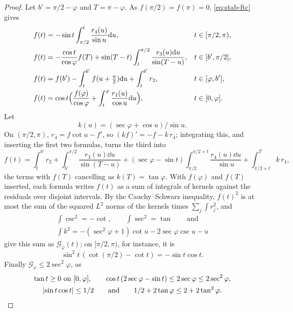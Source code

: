 \begin{proof}
Let $b'=\pi/2-\varphi$ and $T=\pi-\varphi$. As $f(\pi/2)=f(\pi)=0$,
\eqref{eq:stab-ftc} gives
\begin{align*}
  f(t)&=-\sin t\int_{\pi/2}^t\frac{r_4(u)}{\sin u}\mathrm{d} u,
    & t&\in[\pi/2,\pi),\\
  f(t)&=-\frac{\cos t}{\cos\varphi}f(T)
    +\sin(T-t)\int_t^{\pi/2}\frac{r_3(u)\mathrm{d} u}{\sin(T-u)},
    & t&\in[b',\pi/2],\\
  f(t)&=f(b')-\int_t^{b'}f(u+\tfrac\pi2)\mathrm{d} u+\int_t^{b'}r_2,
    & t&\in[\varphi,b'],\\
  f(t)&=\cos t\Bigl(\frac{f(\varphi)}{\cos\varphi}
    +\int_t^\varphi\frac{r_1(u)}{\cos u}\mathrm{d} u\Bigr), & t&\in[0,\varphi].
\end{align*}
Let
\[
  k(u)=(\sec\varphi+\cos u)/\sin u.
\]
On $(\pi/2,\pi)$, $r_4=f\cot u-f'$, so $(kf)'=-f-k\,r_4$; integrating this,
and inserting the first two formulas, turns the third into
\[
  f(t)=\int_t^{b'}r_2+\int_{b'}^{\pi/2}\frac{r_3(u)\dd u}{\sin(T-u)}
  +(\sec\varphi-\sin t)\int_{\pi/2}^{\pi/2+t}\frac{r_4(u)\dd u}{\sin u}
  +\int_{\pi/2+t}^{T}k\,r_4 ,
\]
the terms with $f(T)$ cancelling as $k(T)=\tan\varphi$. With $f(\varphi)$ and
$f(T)$ inserted, each formula writes $f(t)$ as a sum of integrals of kernels
against the residuals over disjoint intervals. By the Cauchy--Schwarz
inequality, $f(t)^2$ is at most the sum of the squared $L^2$ norms of the
kernels times $\sum_j\int r_j^2$, and
\begin{gather*}
  \int\csc^2=-\cot,\qquad\int\sec^2=\tan\qquad\text{and}\\
  \int k^2=-(\sec^2\varphi+1)\cot u-2\sec\varphi\csc u-u
\end{gather*}
give this sum as $\mathcal G_\varphi(t)$; on $[\pi/2,\pi)$, for instance, it is
\[
  \sin^2t\,(\cot(\pi/2)-\cot t)=-\sin t\cos t.
\]
Finally $\mathcal G_\varphi\le2\sec^2\varphi$, as
\begin{gather*}
  \tan t\ge0\text{ on }[0,\varphi],\qquad
  \cos t\,(2\sec\varphi-\sin t)\le2\sec\varphi\le2\sec^2\varphi,\\
  \lvert \sin t\cos t\rvert\le1/2\qquad\text{and}\qquad
  1/2+2\tan\varphi\le2+2\tan^2\varphi.\qedhere
\end{gather*}
\end{proof}

